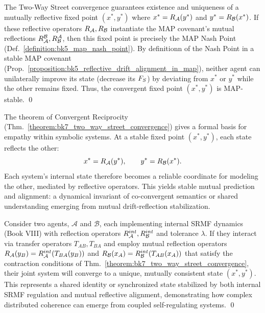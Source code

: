 \begin{demonstratio}
\label{demonstratio:bk7_map_stable_mutual_fixed_point}
The Two-Way Street convergence guarantees existence and uniqueness of a mutually reflective fixed point \((x^{\ast}, y^{\ast})\) where \(x^{\ast} = R_{\mathcal{A}}(y^{\ast})\) and \(y^{\ast} = R_{\mathcal{B}}(x^{\ast})\). If these reflective operators \(R_{\mathcal{A}}, R_{\mathcal{B}}\) instantiate the MAP covenant's mutual reflections \(R^{\mathcal{B}}_{\mathcal{A}}, R^{\mathcal{A}}_{\mathcal{B}}\), then this fixed point is precisely the MAP Nash Point (Def.~\ref{definition:bk5_map_nash_point}). By definitionn of the Nash Point in a stable MAP covenant (Prop.~\ref{proposition:bk5_reflective_drift_alignment_in_map}), neither agent can unilaterally improve its state (decrease its \(F_S\)) by deviating from \(x^{\ast}\) or \(y^{\ast}\) while the other remains fixed. Thus, the convergent fixed point \((x^{\ast}, y^{\ast})\) is MAP-stable. \qed \end{demonstratio}
\begin{remark}
\label{remark:bk7_empathy_as_dynamical_invariant}
\leavevmode\newline
The theorem of Convergent Reciprocity
(Thm.~\ref{theorem:bk7_two_way_street_convergence}) gives a formal basis for
empathy within symbolic systems.
At a stable fixed point \((x^{\ast}, y^{\ast})\), each state reflects the other:
\[
x^{\ast} = R_{\mathcal{A}}(y^{\ast}),
\qquad
y^{\ast} = R_{\mathcal{B}}(x^{\ast}).
\]
Each system's internal state therefore becomes a reliable coordinate for modeling the other, mediated by reflective operators.
This yields stable mutual prediction and alignment: a dynamical invariant of co-convergent semantics or shared understanding emerging from mutual drift-reflection stabilization.
\end{remark}
\begin{scholium}
\label{scholium:bk7_srmf_coupled_agents}
Consider two agents, \(\mathcal{A}\) and \(\mathcal{B}\), each implementing internal SRMF dynamics (Book VIII) with reflection operators \(R_{\mathcal{A}}^{int}, R_{\mathcal{B}}^{int}\) and tolerance \(\lambda\). If they interact via transfer operators \(T_{AB}, T_{BA}\) and employ mutual reflection operators \(R_{\mathcal{A}}(y_B) = R_{\mathcal{A}}^{int}(T_{BA}(y_B))\) and \(R_{\mathcal{B}}(x_A) = R_{\mathcal{B}}^{int}(T_{AB}(x_A))\) that satisfy the contraction conditions of Thm.~\ref{theorem:bk7_two_way_street_convergence}, their joint system will converge to a unique, mutually consistent state \((x^{\ast}, y^{\ast})\). This represents a shared identity or synchronized state stabilized by both internal SRMF regulation and mutual reflective alignment, demonstrating how complex distributed coherence can emerge from coupled self-regulating systems. \qed \end{scholium}
